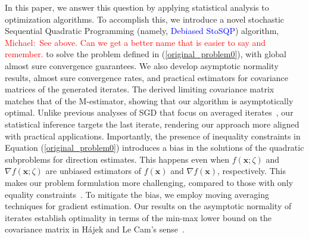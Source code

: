 \documentclass[aos]{imsart}
\numberwithin{equation}{section}
\theoremstyle{plain}
\newcommand{\michael}[1]{\textcolor{red}{Michael:\ #1}}
\begin{document}
\noindent 
In this paper, we answer this question by applying statistical analysis to optimization algorithms. 
To accomplish this, we introduce a novel stochastic Sequential Quadratic Programming (namely, \textcolor{blue}{Debiased StoSQP}) algorithm, 
\michael{See above. Can we get a better name that is easier to say and remember.}
to solve the problem defined in (\ref{original_problem0}), with global almost sure convergence guarantees.
We also develop asymptotic normality results, almost sure convergence rates, and practical estimators for covariance matrices of the generated iterates. The derived limiting covariance matrix matches that of the M-estimator, showing that our algorithm is asymptotically optimal. 
Unlike previous analyses of SGD that focus on averaged iterates~\cite{polyak1992acceleration, chen2020statistical}, our statistical inference targets the last iterate, rendering our approach more aligned with practical applications.
Importantly, the presence of inequality constraints in Equation (\ref{original_problem0}) introduces a bias in the solutions of the quadratic subproblems for direction estimates. 
This happens even when $f(\bm{x}; \zeta)$ and $\nabla f(\bm{x}; \zeta)$ are unbiased estimators of $f(\bm{x})$ and $\nabla f(\bm{x})$, respectively.
This makes our problem formulation more challenging, compared to those with only equality constraints~\cite{berahas2021sequential, na2022asymptotic}. 
To mitigate the bias, we employ moving averaging techniques for gradient estimation. 
Our results on the asymptotic normality of iterates establish optimality in terms of the min-max lower bound on the covariance matrix in H\'ajek and Le Cam's sense~\cite{duchi2021asymptotic}.
\end{document}
